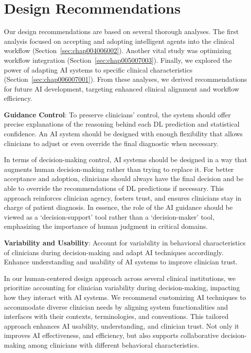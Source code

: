\section{Design Recommendations}
\label{sec:chap007003}

Our design recommendations are based on several thorough analyses.
The first analysis focused on accepting and adopting intelligent agents into the clinical workflow (Section~\ref{sec:chap004006002}).
Another vital study was optimizing workflow integration (Section~\ref{sec:chap005007003}).
Finally, we explored the power of adapting \ac{AI} systems to specific clinical characteristics (Section~\ref{sec:chap006007001}).
From these analyses, we derived recommendations for future \ac{AI} development, targeting enhanced clinical alignment and workflow efficiency.

\vspace{2.00mm}

\noindent
{\bf Guidance Control}:
To preserve clinicians' control, the system should offer precise explanations of the reasoning behind each \ac{DL} prediction and statistical confidence.
An \ac{AI} system should be designed with enough flexibility that allows clinicians to adjust or even override the final diagnostic when necessary.

\vspace{2.00mm}

In terms of decision-making control, \ac{AI} systems should be designed in a way that augments human decision-making rather than trying to replace it.
For better acceptance and adoption, clinicians should always have the final decision and be able to override the recommendations of \ac{DL} predictions if necessary.
This approach reinforces clinician agency, fosters trust, and ensures clinicians stay in charge of patient diagnosis.
In essence, the role of the \ac{AI} guidance should be viewed as a `decision-support' tool rather than a `decision-maker' tool, emphasizing the importance of human judgment in critical domains.

\vspace{2.00mm}

\noindent
{\bf Variability and Usability}:
Account for variability in behavioral characteristics of clinicians during decision-making and adapt \ac{AI} techniques accordingly.
Enhance understanding and usability of \ac{AI} systems to improve clinician trust.

In our human-centered design approach across several clinical institutions, we prioritize accounting for clinician variability during decision-making, impacting how they interact with \ac{AI} systems.
We recommend customizing \ac{AI} techniques to accommodate diverse clinician needs by aligning system functionalities and interfaces with their contexts, terminologies, and conventions.
This tailored approach enhances \ac{AI} usability, understanding, and clinician trust.
Not only it improves \ac{AI} effectiveness, and efficiency, but also supports collaborative decision-making among clinicians with different behavioral characteristics.


